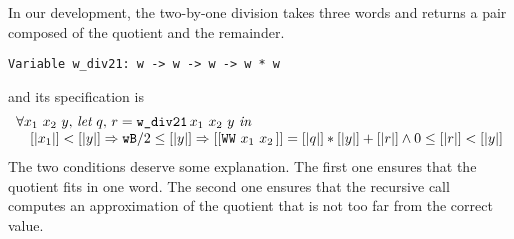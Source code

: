 In our development, the two-by-one division takes
three words and returns a pair composed of the quotient and the remainder.
\begin{verbatim}
Variable w_div21: w -> w -> w -> w * w
\end{verbatim}
and its specification is 
$$\begin{array}{l}
\forall x_1\,\, x_2\,\, y,\, \textit{let}\,\, q,\, r = \texttt{w\_div21}\, x_1\,\, x_2\,\, y\,\, \textit{in}\,\, \\
\hskip10pt [|x_1|] < [|y|] \Rightarrow {\texttt{wB}} / 2 \le [|y|] \Rightarrow  [[\texttt{WW}\,\,x_1\,\,x_2\,]] = [|q|] * [|y|] + [|r|] \land 0 \le [|r|] < [|y|]
\end{array}
$$
The two conditions deserve some explanation.
The first one ensures that the quotient fits in one word.
The second one %
ensures that the recursive call computes an approximation 
of the quotient that is not too far from the correct value.

